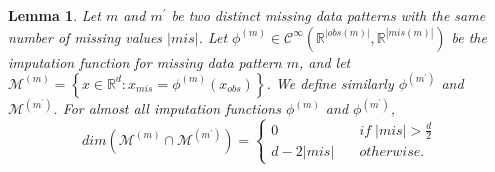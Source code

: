\documentclass{article}
\newcommand{\RR}{\mathbb{R}}
\newcommand{\Ccal}{\mathcal{C}}
\newcommand{\Mcal}{\mathcal{M}}
\newcommand{\br}[1]{\left(#1\right)}
\newcommand{\cbr}[1]{\left\{#1\right\}}
\theoremstyle{plain}
\newtheorem{lemma}{Lemma}[section]
\begin{document}
\begin{lemma}
\label{lem:manifold_intersection}
    Let $m$ and $m^\prime$ be two distinct missing data patterns with the same number of missing values $|mis|$. Let $\phi^{(m)}\in \Ccal^\infty\br{\RR^{|obs(m)|}, \RR^{|mis(m)|}}$ be the imputation function for missing data pattern $m$, and let $\Mcal^{(m)} = \cbr{x \in \RR^d: x_{mis} = \phi^{(m)}(x_{obs})}$. We define similarly $\phi^{(m^\prime)}$ and $\Mcal^{(m^\prime)}$.
    For almost all imputation functions $\phi^{(m)}$ and $\phi^{(m^\prime)}$,
    \begin{equation}
        dim\br{ \Mcal^{(m)} \cap \Mcal^{(m^\prime)} } =
        \begin{cases}
            0 \quad & if \; |mis| > \frac{d}{2}\\
            d - 2|mis| \quad &otherwise.
        \end{cases}
    \end{equation}
\end{lemma}
\end{document}
